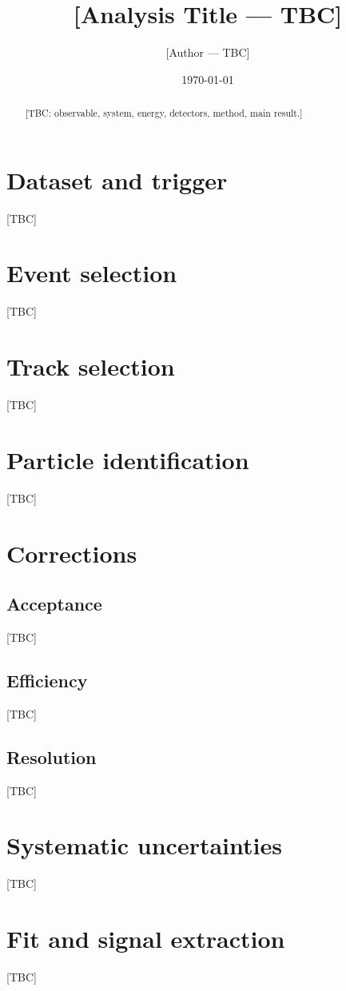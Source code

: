\documentclass[11pt,a4paper]{article}
\title{[Analysis Title --- TBC]}
\author{[Author --- TBC]}
\date{\today}
\begin{document}
\maketitle

\begin{abstract}
[TBC: observable, system, energy, detectors, method, main result.]
\end{abstract}

\section{Dataset and trigger}
[TBC]

\section{Event selection}
[TBC]

\section{Track selection}
[TBC]

\section{Particle identification}
[TBC]

\section{Corrections}
\subsection{Acceptance}
[TBC]
\subsection{Efficiency}
[TBC]
\subsection{Resolution}
[TBC]

\section{Systematic uncertainties}
[TBC]

\section{Fit and signal extraction}
[TBC]
\end{document}
